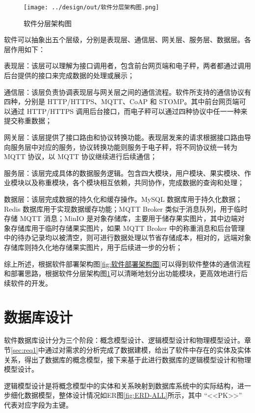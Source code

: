 \begin{figure}
    \centering
    \texttt{[image: ../design/out/软件分层架构图.png]}
    \caption{软件分层架构图}
    \label{fig:软件分层架构图}
\end{figure}

软件可以抽象出五个层级，分别是表现层、通信层、网关层、服务层、数据层。各层作用如下：

表现层：该层可以理解为接口调用者，包含前台网页端和电子秤，两者都通过调用后台提供的接口来完成数据的处理或展示；

通信层：该层负责协调表现层与网关层之间的通信流程。软件所支持的通信协议有四种，分别是 HTTP/HTTPS、MQTT、CoAP 和 STOMP。其中前台网页端可以通过 HTTP/HTTPS 调用后台接口，而电子秤可以通过四种协议中任一一种来提交称重数据；

网关层：该层提供了接口路由和协议转换功能。表现层发来的请求根据接口路由导向服务层中对应的服务，协议转换功能则服务于电子秤，将不同协议统一转为 MQTT 协议，以 MQTT 协议继续进行后续通信；

服务层：该层完成具体的数据服务逻辑。包含四大模块，用户模块、果实模块、作业模块以及称重模块，各个模块相互依赖，共同协作，完成数据的查询和处理；

数据层：该层完成数据的持久化和缓存操作。MySQL 数据库用于持久化数据；Redis 数据库用于实现数据缓存功能；MQTT Broker 类似于消息队列，用于临时存储 MQTT 消息；MinIO 是对象存储库，主要用于储存果实图片，其中边端对象存储库用于临时存储果实图片，如果 MQTT Broker 中的称重消息和后台管理中的待办记录均以被清空，则可进行数据处理以节省存储成本，相对的，远端对象存储库则持久化地存储果实图片，用于后续进一步的分析；

综上所述，根据软件部署架构图\ref{fig:软件部署架构图}可以得到软件整体的通信流程和部署思路，根据软件分层架构图\ref{fig:软件分层架构图}可以清晰地划分出功能模块，更高效地进行后续软件的开发。

\section{数据库设计}\label{sec:database}

软件数据库设计分为三个阶段：概念模型设计、逻辑模型设计和物理模型设计\cite{苗雪兰2001数据库系统原理及应用教程}。章节\ref{sec:req1}中通过对需求的分析完成了数据建模，给出了软件中存在的实体及实体关系，得出了数据库的概念模型，接下来基于此进行数据库的逻辑模型设计和物理模型设计。

逻辑模型设计是将概念模型中的实体和关系映射到数据库系统中的实际结构\cite{苗雪兰2001数据库系统原理及应用教程}，进一步细化数据模型，整体设计情况如ER图\ref{fig:ERD-ALL}所示，其中 “<<PK>>” 代表对应字段为主键。

